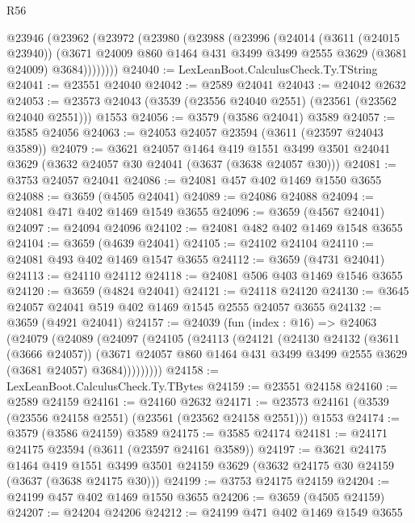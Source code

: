 \begin{lexlean}{R56}
\begin{coremodule}
    @23946
      (@23962
        (@23972
          (@23980
            (@23988
              (@23996
                (@24014
                  (@3611 (@24015 @23940))
                  (@3671 @24009 @860 @1464 @431 @3499 @3499 @2555 @3629 (@3681 @24009) @3684))))))))
@24040 := LexLeanBoot.CalculusCheck.Ty.TString
@24041 := @23551 @24040
@24042 := @2589 @24041
@24043 := @24042 @2632
@24053 := @23573 @24043 (@3539 (@23556 @24040 @2551) (@23561 (@23562 @24040 @2551))) @1553
@24056 := @3579 (@3586 @24041) @3589
@24057 := @3585 @24056
@24063 := @24053 @24057 @23594 (@3611 (@23597 @24043 @3589))
@24079 := @3621
    @24057
    @1464
    @419
    @1551
    @3499
    @3501
    @24041
    @3629
    (@3632 @24057 @30 @24041 (@3637 (@3638 @24057 @30)))
@24081 := @3753 @24057 @24041
@24086 := @24081 @457 @402 @1469 @1550 @3655
@24088 := @3659 (@4505 @24041)
@24089 := @24086 @24088
@24094 := @24081 @471 @402 @1469 @1549 @3655
@24096 := @3659 (@4567 @24041)
@24097 := @24094 @24096
@24102 := @24081 @482 @402 @1469 @1548 @3655
@24104 := @3659 (@4639 @24041)
@24105 := @24102 @24104
@24110 := @24081 @493 @402 @1469 @1547 @3655
@24112 := @3659 (@4731 @24041)
@24113 := @24110 @24112
@24118 := @24081 @506 @403 @1469 @1546 @3655
@24120 := @3659 (@4824 @24041)
@24121 := @24118 @24120
@24130 := @3645 @24057 @24041 @519 @402 @1469 @1545 @2555 @24057 @3655
@24132 := @3659 (@4921 @24041)
@24157 := @24039
    (fun (index : @16) =>
    @24063
      (@24079
        (@24089
          (@24097
            (@24105
              (@24113
                (@24121
                  (@24130
                    @24132
                    (@3611 (@3666 @24057))
                    (@3671
                      @24057
                      @860
                      @1464
                      @431
                      @3499
                      @3499
                      @2555
                      @3629
                      (@3681 @24057)
                      @3684)))))))))
@24158 := LexLeanBoot.CalculusCheck.Ty.TBytes
@24159 := @23551 @24158
@24160 := @2589 @24159
@24161 := @24160 @2632
@24171 := @23573 @24161 (@3539 (@23556 @24158 @2551) (@23561 (@23562 @24158 @2551))) @1553
@24174 := @3579 (@3586 @24159) @3589
@24175 := @3585 @24174
@24181 := @24171 @24175 @23594 (@3611 (@23597 @24161 @3589))
@24197 := @3621
    @24175
    @1464
    @419
    @1551
    @3499
    @3501
    @24159
    @3629
    (@3632 @24175 @30 @24159 (@3637 (@3638 @24175 @30)))
@24199 := @3753 @24175 @24159
@24204 := @24199 @457 @402 @1469 @1550 @3655
@24206 := @3659 (@4505 @24159)
@24207 := @24204 @24206
@24212 := @24199 @471 @402 @1469 @1549 @3655

\end{coremodule}
\end{lexlean}
